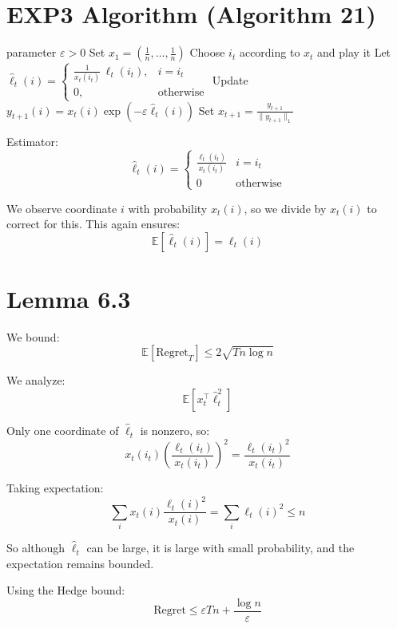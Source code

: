 \documentclass{article}
\begin{document}
\section{EXP3 Algorithm (Algorithm 21)}
\FloatBarrier
\begin{algorithm}
\caption{EXP3 - simple version}
\begin{algorithmic}[1]
\REQUIRE parameter $\varepsilon > 0$
\STATE Set $x_1 = \left(\frac{1}{n},\dots,\frac{1}{n}\right)$
    \STATE Choose $i_t$ according to $x_t$ and play it
    \STATE Let
    $
    \hat{\ell}_t(i) =
    \begin{cases}
    \frac{1}{x_t(i_t)}\,\ell_t(i_t), & i = i_t \\
    0, & \text{otherwise}
    \end{cases}
    $
    \STATE Update $y_{t+1}(i) = x_t(i)\exp(-\varepsilon \hat{\ell}_t(i))$
    \STATE Set $x_{t+1} = \frac{y_{t+1}}{\|y_{t+1}\|_1}$
\ENDFOR
\end{algorithmic}
\end{algorithm}
\FloatBarrier

Estimator:
\[
\hat{\ell}_t(i) =
\begin{cases}
\frac{\ell_t(i_t)}{x_t(i_t)} & i = i_t \\
0 & \text{otherwise}
\end{cases}
\]

We observe coordinate $i$ with probability $x_t(i)$, so we divide by $x_t(i)$ to correct for this. This again ensures:
\[
\mathbb{E}[\hat{\ell}_t(i)] = \ell_t(i)
\]

\section{Lemma 6.3}

We bound:
\[
\mathbb{E}[\text{Regret}_T] \le 2\sqrt{T n \log n}
\]

We analyze:
\[
\mathbb{E}[x_t^\top \hat{\ell}_t^2]
\]

Only one coordinate of $\hat{\ell}_t$ is nonzero, so:
\[
x_t(i_t)\left(\frac{\ell_t(i_t)}{x_t(i_t)}\right)^2 = \frac{\ell_t(i_t)^2}{x_t(i_t)}
\]

Taking expectation:
\[
\sum_i x_t(i)\frac{\ell_t(i)^2}{x_t(i)} = \sum_i \ell_t(i)^2 \le n
\]

So although $\hat{\ell}_t$ can be large, it is large with small probability, and the expectation remains bounded.

Using the Hedge bound:
\[
\text{Regret} \le \varepsilon T n + \frac{\log n}{\varepsilon}
\]
\end{document}
